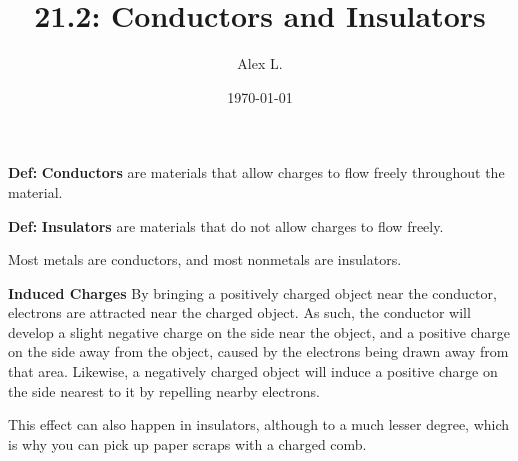\documentclass{article}
\title{21.2: Conductors and Insulators}
\author{Alex L.}
\date{\today}
\begin{document}
\maketitle
\textbf{Def:} \textbf{Conductors} are materials that allow charges to flow freely throughout the material.

\textbf{Def:} \textbf{Insulators} are materials that do not allow charges to flow freely.

Most metals are conductors, and most nonmetals are insulators.

\textbf{Induced Charges} By bringing a positively charged object near the conductor, electrons are attracted near the charged object. As such, the conductor will develop a slight negative charge on the side near the object, and a positive charge on the side away from the object, caused by the electrons being drawn away from that area. Likewise, a negatively charged object will induce a positive charge on the side nearest to it by repelling nearby electrons.

This effect can also happen in insulators, although to a much lesser degree, which is why you can pick up paper scraps with a charged comb. 
\end{document}
